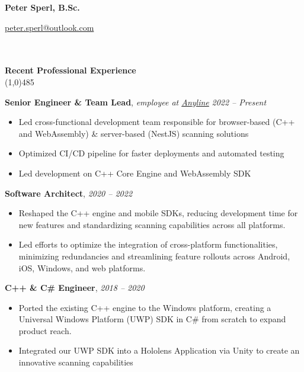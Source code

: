 \documentclass[9pt]{extarticle}
\newcommand\negativespace[1][-0.12cm]{\hspace*{#1}}
\begin{document}
\centerline{{\LARGE \bf Peter Sperl, B.Sc.}}
\centerline{\href{mailto:peter.sperl@outlook.com}{peter.sperl@outlook.com}}


\noindent %
\\\\
\vspace*{-6pt}
{\negativespace \Large \bf Recent Professional Experience}\\
\line(1,0){485}
\\
\noindent

\noindent
{\bf Senior Engineer \& Team Lead}, \textit{employee at \href{https://anyline.com}{Anyline}} \hfill \textit{2022 -- Present}
\begin{itemize}
\setlength\itemsep{0.05em}
\item Led cross-functional development team responsible for browser-based (C++ and WebAssembly) & server-based
(NestJS) scanning solutions
\item Optimized CI/CD pipeline for faster deployments and automated testing
\item Led development on C++ Core Engine and WebAssembly SDK
\end{itemize}

\noindent
{\bf Software Architect}, \hfill \textit{2020 -- 2022} \\
\begin{itemize}
\setlength\itemsep{0.05em}
\item Reshaped the C++ engine and mobile SDKs, reducing development time for new features and standardizing scanning capabilities across all platforms.
\item Led efforts to optimize the integration of cross-platform functionalities, minimizing redundancies and streamlining feature rollouts across Android, iOS, Windows, and web platforms.
\end{itemize}

\noindent
{\bf C++ \& C\# Engineer}, \hfill \textit{2018 -- 2020} \\
\begin{itemize}
\setlength\itemsep{0.05em}
\item Ported the existing C++ engine to the Windows platform, creating a Universal Windows Platform (UWP) SDK in C\# from scratch to expand product reach.
\item Integrated our UWP SDK into a Hololens Application via Unity to create an innovative scanning capabilities
\end{itemize}
\end{document}
